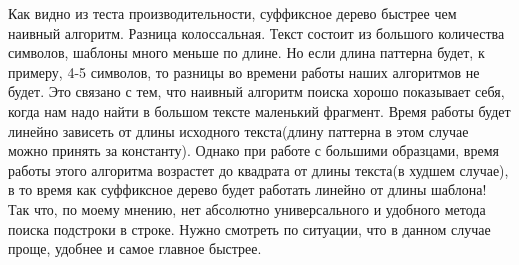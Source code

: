 Как видно из теста производительности, суффиксное дерево быстрее чем наивный алгоритм. Разница колоссальная. Текст состоит из большого количества символов, шаблоны много меньше по длине. Но если длина паттерна будет, к примеру, 4-5 символов, то разницы во времени работы наших алгоритмов не будет. Это связано с тем, что наивный алгоритм поиска хорошо показывает себя, когда нам надо найти в большом тексте маленький фрагмент. Время работы будет линейно зависеть от длины исходного текста(длину паттерна в этом случае можно принять за константу). Однако при работе с большими образцами, время работы этого алгоритма возрастет до квадрата от длины текста(в худшем случае), в то время как суффиксное дерево будет работать линейно от длины шаблона! Так что, по моему мнению, нет абсолютно универсального и удобного метода поиска подстроки в строке. Нужно смотреть по ситуации, что в данном случае проще, удобнее и самое главное быстрее.
\pagebreak
